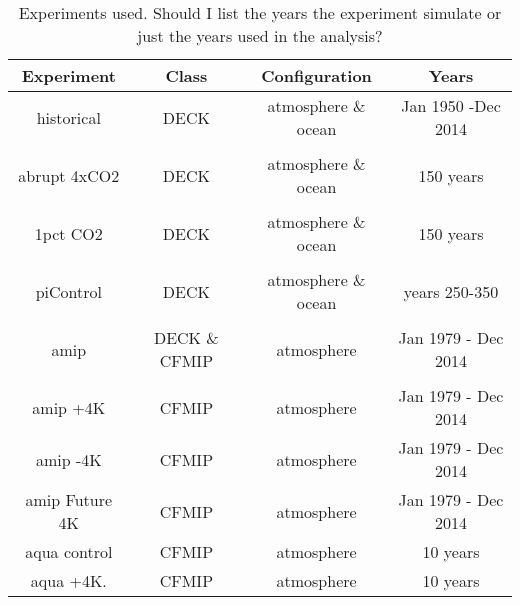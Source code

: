 \documentclass[draft]{agujournal2019}
\begin{document}
 \begin{table}
\begin{center}
\caption{Experiments used.   Should I list the years the experiment simulate or just the years used in the analysis?}
    \begin{tabular}{*{4}{c}}
    \hline
    \hline
 Experiment & Class & Configuration & Years   \\ \hline
    historical        &   DECK      &  atmosphere \& ocean   &  Jan 1950 -Dec 2014               \\ 
    \\
    abrupt 4xCO2   & DECK       &  atmosphere \& ocean       & 150 years  \\  
    \\
    1pct CO2   & DECK        &  atmosphere \& ocean  & 150 years \\  
    \\
    piControl  & DECK   &  atmosphere \& ocean  &   years 250-350  \\  
    \\
    amip  & DECK \& CFMIP   &  atmosphere   & Jan 1979 - Dec 2014  \\  
    \\
    amip +4K  & CFMIP       &  atmosphere   & Jan 1979 - Dec 2014  \\ 
    amip -4K   & CFMIP       &  atmosphere   & Jan 1979 - Dec 2014 \\ 
    amip Future 4K  & CFMIP  & atmosphere & Jan 1979 - Dec 2014 \\
    aqua control        & CFMIP  & atmosphere  & 10 years \\
    aqua +4K.  & CFMIP    & atmosphere  &  10 years \\ \hline

    \end{tabular}\par
    \label{tab:lambda}
\end{center}
\end{table}
\end{document}
